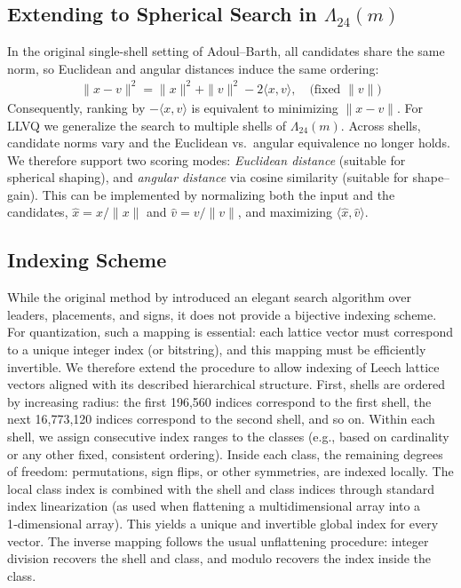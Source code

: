 \documentclass{article}
\theoremstyle{plain}
\theoremstyle{definition}
\theoremstyle{remark}
\begin{document}
\subsection{Extending to Spherical Search in $\Lambda_{24}(m)$}
\label{sec:spherical-search}

In the original single-shell setting of Adoul--Barth, all candidates share the same norm, so Euclidean and angular distances induce the same ordering:
\begin{align}
\|x - v\|^2 = \|x\|^2 + \|v\|^2 - 2\langle x, v\rangle,
\quad \text{(fixed $\|v\|$)}
\label{eq:spherical-euclidean-relation}
\end{align}
Consequently, ranking by $-\langle x,v\rangle$ is equivalent to minimizing $\|x-v\|$. For LLVQ we generalize the search to multiple shells of $\Lambda_{24}(m)$. Across shells, candidate norms vary and the Euclidean vs.\ angular equivalence no longer holds. We therefore support two scoring modes: \emph{Euclidean distance} (suitable for spherical shaping), and \emph{angular distance} via cosine similarity (suitable for shape--gain). This can be implemented by normalizing both the input and the candidates, $\hat{x}=x/\|x\|$ and $\hat{v}=v/\|v\|$, and maximizing $\langle \hat{x}, \hat{v}\rangle$.

\subsection{Indexing Scheme}
\label{sec:indexing-scheme}

While the original method by \citet{adoul1988nearest} introduced an elegant search algorithm over leaders, placements, and signs, it does not provide a bijective indexing scheme. For quantization, such a mapping is essential: each lattice vector must correspond to a unique integer index (or bitstring), and this mapping must be efficiently invertible. We therefore extend the procedure to allow indexing of Leech lattice vectors aligned with its described hierarchical structure. First, shells are ordered by increasing radius: the first 196,560 indices correspond to the first shell, the next 16,773,120 indices correspond to the second shell, and so on. Within each shell, we assign consecutive index ranges to the classes (e.g., based on cardinality or any other fixed, consistent ordering). Inside each class, the remaining degrees of freedom: permutations, sign flips, or other symmetries, are indexed locally. The local class index is combined with the shell and class indices through standard index linearization (as used when flattening a multidimensional array into a 1‑dimensional array). This yields a unique and invertible global index for every vector. The inverse mapping follows the usual unflattening procedure: integer division recovers the shell and class, and modulo recovers the index inside the class.
\end{document}
